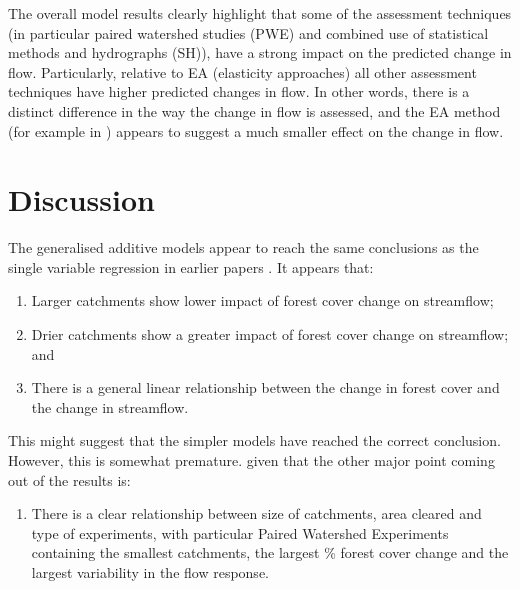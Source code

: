 \documentclass[]{elsarticle} %
\providecommand{\tightlist}{%
  \setlength{\itemsep}{0pt}\setlength{\parskip}{0pt}}
\begin{document}
The overall model results clearly highlight that some of the assessment techniques (in particular paired watershed studies (PWE) and combined use of statistical methods and hydrographs (SH)), have a strong impact on the predicted change in flow. Particularly, relative to EA (elasticity approaches) all other assessment techniques have higher predicted changes in flow. In other words, there is a distinct difference in the way the change in flow is assessed, and the EA method (for example in \citet{zhou2015}) appears to suggest a much smaller effect on the change in flow.

\hypertarget{discussion}{%
\section{Discussion}\label{discussion}}

The generalised additive models appear to reach the same conclusions as the single variable regression in earlier papers \citep{zhang2017, filoso2017}. It appears that:

\begin{enumerate}
\def\labelenumi{\arabic{enumi}.}
\tightlist
\item
  Larger catchments show lower impact of forest cover change on streamflow;
\item
  Drier catchments show a greater impact of forest cover change on streamflow; and
\item
  There is a general linear relationship between the change in forest cover and the change in streamflow.
\end{enumerate}

This might suggest that the simpler models have reached the correct conclusion. However, this is somewhat premature. given that the other major point coming out of the results is:

\begin{enumerate}
\def\labelenumi{\arabic{enumi}.}
\setcounter{enumi}{3}
\tightlist
\item
  There is a clear relationship between size of catchments, area cleared and type of experiments, with particular Paired Watershed Experiments containing the smallest catchments, the largest \% forest cover change and the largest variability in the flow response.
\end{enumerate}
\end{document}
